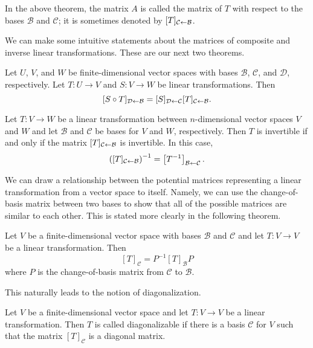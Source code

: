 \documentclass[../m073main.tex]{subfiles}
\begin{document}
In the above theorem, the matrix $A$ is called the matrix of $T$ with respect to the bases $\mathcal{B}$ and $\mathcal{C}$; it is sometimes denoted by $[T]_{\mathcal{C} \leftarrow \mathcal{B}}$.

We can make some intuitive statements about the matrices of composite and inverse linear transformations.
These are our next two theorems.

\begin{theorem}
	Let $U$, $V$, and $W$ be finite-dimensional vector spaces with bases $\mathcal{B}$, $\mathcal{C}$, and $\mathcal{D}$, respectively.
	Let $T : U \to V$ and $S : V \to W$ be linear transformations.
	Then
	\[ [S \circ T]_{\mathcal{D} \leftarrow \mathcal{B}} = [S]_{\mathcal{D} \leftarrow \mathcal{C}} [T]_{\mathcal{C} \leftarrow \mathcal{B}}. \]
\end{theorem}

\begin{theorem}
	Let $T : V \to W$ be a linear transformation between $n$-dimensional vector spaces $V$ and $W$ and let $\mathcal{B}$ and $\mathcal{C}$ be bases for $V$ and $W$, respectively.
	Then $T$ is invertible if and only if the matrix $[T]_{\mathcal{C} \leftarrow \mathcal{B}}$ is invertible.
	In this case,
	\[ \left( [T]_{\mathcal{C} \leftarrow \mathcal{B}} \right)^{-1} = \left[ T^{-1} \right]_{\mathcal{B} \leftarrow \mathcal{C}}. \]
\end{theorem}

We can draw a relationship between the potential matrices representing a linear transformation from a vector space to itself.
Namely, we can use the change-of-basis matrix between two bases to show that all of the possible matrices are similar to each other.
This is stated more clearly in the following theorem.

\begin{theorem}
	Let $V$ be a finite-dimensional vector space with bases $\mathcal{B}$ and $\mathcal{C}$ and let $T : V \to V$ be a linear transformation.
	Then
	\[ [T]_{\mathcal{C}} = P^{-1}[T]_{\mathcal{B}}P \]
	where $P$ is the change-of-basis matrix from $\mathcal{C}$ to $\mathcal{B}$.
\end{theorem}

This naturally leads to the notion of diagonalization.

\begin{definition}
	Let $V$ be a finite-dimensional vector space and let $T : V \to V$ be a linear transformation.
	Then $T$ is called diagonalizable if there is a basis $\mathcal{C}$ for $V$ such that the matrix $[T]_{\mathcal{C}}$ is a diagonal matrix.
\end{definition}
\end{document}
